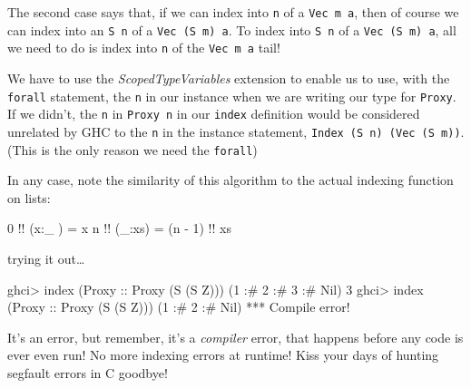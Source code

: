 \documentclass[]{article}
\newenvironment{Shaded}{}{}
\newcommand{\DataTypeTok}[1]{\textcolor[rgb]{0.56,0.13,0.00}{{#1}}}
\newcommand{\DecValTok}[1]{\textcolor[rgb]{0.25,0.63,0.44}{{#1}}}
\newcommand{\OtherTok}[1]{\textcolor[rgb]{0.00,0.44,0.13}{{#1}}}
\newcommand{\FunctionTok}[1]{\textcolor[rgb]{0.02,0.16,0.49}{{#1}}}
\newcommand{\NormalTok}[1]{{#1}}
\begin{document}
The second case says that, if we can index into \texttt{n} of a
\texttt{Vec\ m\ a}, then of course we can index into an \texttt{S\ n} of a
\texttt{Vec\ (S\ m)\ a}. To index into \texttt{S\ n} of a
\texttt{Vec\ (S\ m)\ a}, all we need to do is index into \texttt{n} of the
\texttt{Vec\ m\ a} tail!

We have to use the \emph{ScopedTypeVariables} extension to enable us to use,
with the \texttt{forall} statement, the \texttt{n} in our instance when we are
writing our type for \texttt{Proxy}. If we didn't, the \texttt{n} in
\texttt{Proxy\ n} in our \texttt{index} definition would be considered unrelated
by GHC to the \texttt{n} in the instance statement,
\texttt{Index\ (S\ n)\ (Vec\ (S\ m))}. (This is the only reason we need the
\texttt{forall})

In any case, note the similarity of this algorithm to the actual indexing
function on lists:

\begin{Shaded}
\begin{Highlighting}[]
\DecValTok{0} \FunctionTok{!!} \NormalTok{(x}\FunctionTok{:}\NormalTok{_ ) }\FunctionTok{=} \NormalTok{x}
\NormalTok{n }\FunctionTok{!!} \NormalTok{(_}\FunctionTok{:}\NormalTok{xs) }\FunctionTok{=} \NormalTok{(n }\FunctionTok{-} \DecValTok{1}\NormalTok{) }\FunctionTok{!!} \NormalTok{xs}
\end{Highlighting}
\end{Shaded}

trying it out\ldots{}

\begin{Shaded}
\begin{Highlighting}[]
\NormalTok{ghci}\FunctionTok{>} \NormalTok{index (}\DataTypeTok{Proxy}\OtherTok{ ::} \DataTypeTok{Proxy} \NormalTok{(}\DataTypeTok{S} \NormalTok{(}\DataTypeTok{S} \DataTypeTok{Z}\NormalTok{))) (}\DecValTok{1} \FunctionTok{:#} \DecValTok{2} \FunctionTok{:#} \DecValTok{3} \FunctionTok{:#} \DataTypeTok{Nil}\NormalTok{)}
\DecValTok{3}
\NormalTok{ghci}\FunctionTok{>} \NormalTok{index (}\DataTypeTok{Proxy}\OtherTok{ ::} \DataTypeTok{Proxy} \NormalTok{(}\DataTypeTok{S} \NormalTok{(}\DataTypeTok{S} \DataTypeTok{Z}\NormalTok{))) (}\DecValTok{1} \FunctionTok{:#} \DecValTok{2} \FunctionTok{:#} \DataTypeTok{Nil}\NormalTok{)}
\FunctionTok{***} \DataTypeTok{Compile} \NormalTok{error}\FunctionTok{!}
\end{Highlighting}
\end{Shaded}

It's an error, but remember, it's a \emph{compiler} error, that happens before
any code is ever even run! No more indexing errors at runtime! Kiss your days of
hunting segfault errors in C goodbye!
\end{document}
